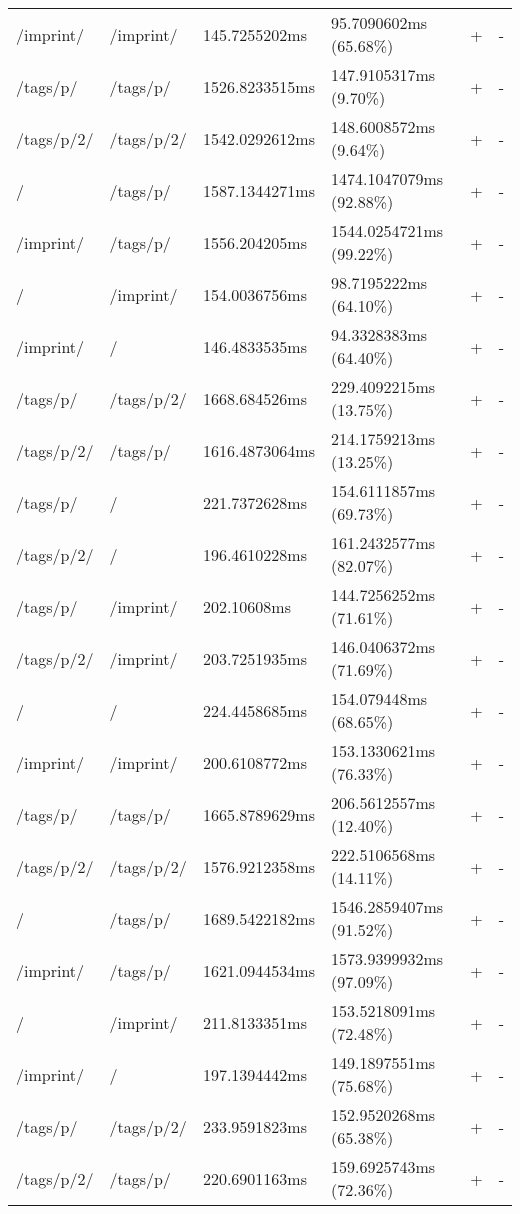 \begin{center}
\begin{longtable}{llllll}
	/imprint/ & /imprint/ & 145.7255202ms & 95.7090602ms (65.68\%) & + & - \\
	/tags/p/ & /tags/p/ & 1526.8233515ms & 147.9105317ms (9.70\%) & + & - \\
	/tags/p/2/ & /tags/p/2/ & 1542.0292612ms & 148.6008572ms (9.64\%) & + & - \\
	\hline
	/ & /tags/p/ & 1587.1344271ms & 1474.1047079ms (92.88\%) & + & - \\
	/imprint/ & /tags/p/ & 1556.204205ms & 1544.0254721ms (99.22\%) & + & - \\
	\hline
	/ & /imprint/ & 154.0036756ms & 98.7195222ms (64.10\%) & + & - \\
	/imprint/ & / & 146.4833535ms & 94.3328383ms (64.40\%) & + & - \\
	\hline
	\hline
	/tags/p/ & /tags/p/2/ & 1668.684526ms & 229.4092215ms (13.75\%) & + & - \\
	/tags/p/2/ & /tags/p/ & 1616.4873064ms & 214.1759213ms (13.25\%) & + & - \\
	\hline
	/tags/p/ & / & 221.7372628ms & 154.6111857ms (69.73\%) & + & - \\
	/tags/p/2/ & / & 196.4610228ms & 161.2432577ms (82.07\%) & + & - \\
	/tags/p/ & /imprint/ & 202.10608ms & 144.7256252ms (71.61\%) & + & - \\
	/tags/p/2/ & /imprint/ & 203.7251935ms & 146.0406372ms (71.69\%) & + & - \\
	\hline
	/ & / & 224.4458685ms & 154.079448ms (68.65\%) & + & - \\
	/imprint/ & /imprint/ & 200.6108772ms & 153.1330621ms (76.33\%) & + & - \\
	/tags/p/ & /tags/p/ & 1665.8789629ms & 206.5612557ms (12.40\%) & + & - \\
	/tags/p/2/ & /tags/p/2/ & 1576.9212358ms & 222.5106568ms (14.11\%) & + & - \\
	\hline
	/ & /tags/p/ & 1689.5422182ms & 1546.2859407ms (91.52\%) & + & - \\
	/imprint/ & /tags/p/ & 1621.0944534ms & 1573.9399932ms (97.09\%) & + & - \\
	\hline
	/ & /imprint/ & 211.8133351ms & 153.5218091ms (72.48\%) & + & - \\
	/imprint/ & / & 197.1394442ms & 149.1897551ms (75.68\%) & + & - \\
	\hline
	\hline
	/tags/p/ & /tags/p/2/ & 233.9591823ms & 152.9520268ms (65.38\%) & + & - \\
	/tags/p/2/ & /tags/p/ & 220.6901163ms & 159.6925743ms (72.36\%) & + & - \\

\end{longtable}
\end{center}
